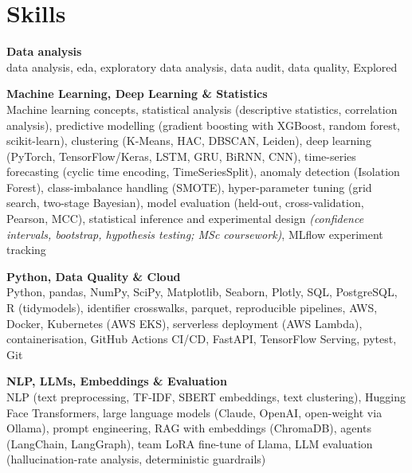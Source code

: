 \documentclass[a4paper,11pt]{article}
\newcommand{\skillgroup}[2]{{\color{headernavy}\textbf{#1}}\\ #2\par\vspace{3pt}}
\begin{document}
\section{Skills}
\skillgroup{Data analysis}{data analysis, eda, exploratory data analysis, data audit, data quality, Explored}
\skillgroup{Machine Learning, Deep Learning \& Statistics}{Machine learning concepts, statistical analysis (descriptive statistics, correlation analysis), predictive modelling (gradient boosting with XGBoost, random forest, scikit-learn), clustering (K-Means, HAC, DBSCAN, Leiden), deep learning (PyTorch, TensorFlow/Keras, LSTM, GRU, BiRNN, CNN), time-series forecasting (cyclic time encoding, TimeSeriesSplit), anomaly detection (Isolation Forest), class-imbalance handling (SMOTE), hyper-parameter tuning (grid search, two-stage Bayesian), model evaluation (held-out, cross-validation, Pearson, MCC), statistical inference and experimental design \textit{(confidence intervals, bootstrap, hypothesis testing; MSc coursework)}, MLflow experiment tracking}
\skillgroup{Python, Data Quality \& Cloud}{Python, pandas, NumPy, SciPy, Matplotlib, Seaborn, Plotly, SQL, PostgreSQL, R (tidymodels), identifier crosswalks, parquet, reproducible pipelines, AWS, Docker, Kubernetes (AWS EKS), serverless deployment (AWS Lambda), containerisation, GitHub Actions CI/CD, FastAPI, TensorFlow Serving, pytest, Git}
\skillgroup{NLP, LLMs, Embeddings \& Evaluation}{NLP (text preprocessing, TF-IDF, SBERT embeddings, text clustering), Hugging Face Transformers, large language models (Claude, OpenAI, open-weight via Ollama), prompt engineering, RAG with embeddings (ChromaDB), agents (LangChain, LangGraph), team LoRA fine-tune of Llama, LLM evaluation (hallucination-rate analysis, deterministic guardrails)}
\end{document}
